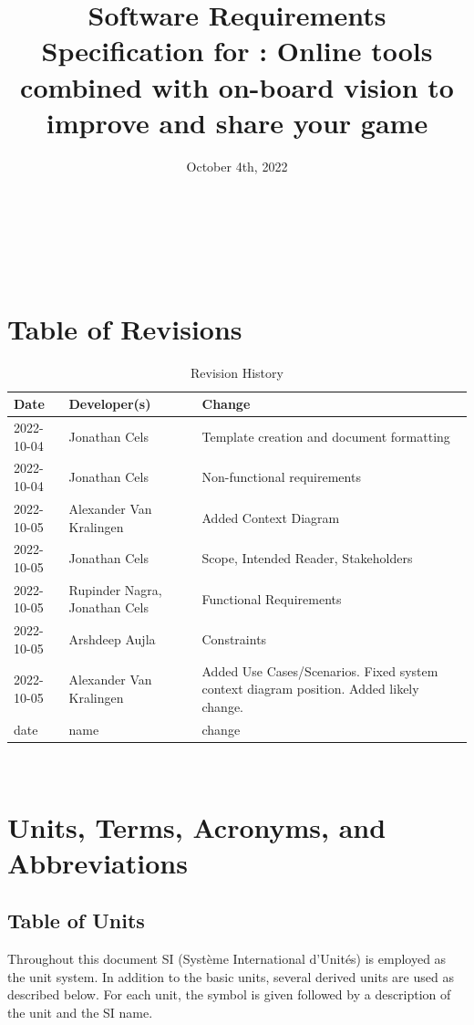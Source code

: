\documentclass[12pt]{article}
\begin{document}
\title{Software Requirements Specification for \progname{}: Online tools combined with on-board vision to improve and share your game} 
\author{\authname}
\date{October 4th, 2022}
	
\maketitle

~\newpage

\tableofcontents

~\newpage

\section*{Table of Revisions}
\begin{table}[hp]
\caption{Revision History} \label{TblRevisionHistory}
\begin{tabularx}{\textwidth}{llX}
\toprule
\textbf{Date} & \textbf{Developer(s)} & \textbf{Change}\\
\midrule
2022-10-04 & Jonathan Cels & Template creation and document formatting\\ 
2022-10-04 & Jonathan Cels & Non-functional requirements\\
2022-10-05 & Alexander Van Kralingen & Added Context Diagram\\
2022-10-05 & Jonathan Cels & Scope, Intended Reader, Stakeholders\\
2022-10-05 & Rupinder Nagra, Jonathan Cels & Functional Requirements\\
2022-10-05 & Arshdeep Aujla & Constraints\\
2022-10-05 & Alexander Van Kralingen & Added Use Cases/Scenarios. Fixed system context diagram position. Added likely change.\\
date & name & change\\
\bottomrule
\end{tabularx}
\end{table}

~\newpage

\section{Units, Terms, Acronyms, and Abbreviations}

\subsection{Table of Units}
Throughout this document SI (Syst\`{e}me International d'Unit\'{e}s) is employed
as the unit system.  In addition to the basic units, several derived units are
used as described below.  For each unit, the symbol is given followed by a
description of the unit and the SI name.
\end{document}
